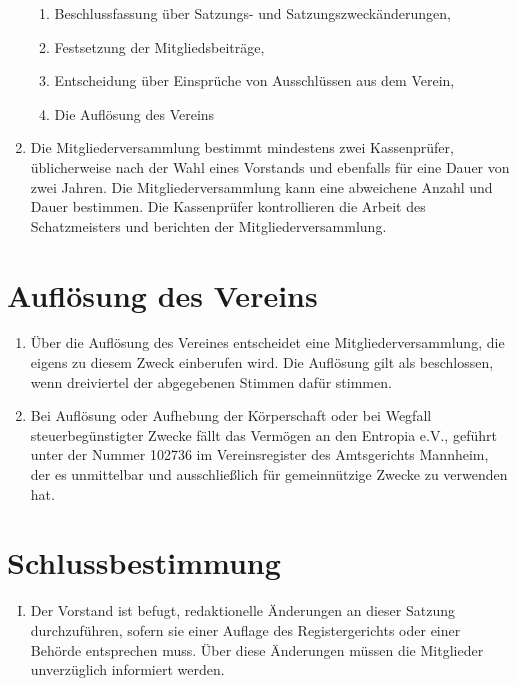 \documentclass[12pt,a4paper,titlepage]{scrartcl}
\begin{document}
\begin{enumerate}
\begin{enumerate}
\item Beschlussfassung über Satzungs- und Satzungszweckänderungen,
\item Festsetzung der Mitgliedsbeiträge,
\item Entscheidung über Einsprüche von Ausschlüssen aus dem Verein,
\item Die Auflösung des Vereins
\end{enumerate}
\item  Die Mitgliederversammlung bestimmt mindestens zwei Kassenprüfer, üblicherweise
nach der Wahl eines Vorstands und ebenfalls für eine Dauer von zwei Jahren. Die Mitgliederversammlung kann eine abweichene Anzahl und Dauer bestimmen. Die Kassenprüfer kontrollieren die Arbeit des Schatzmeisters und berichten der Mitgliederversammlung.
\end{enumerate}

\section{Auflösung des Vereins}
\begin{enumerate}
\item Über die Auflösung des Vereines entscheidet eine Mitgliederversammlung, die eigens zu diesem Zweck einberufen wird. Die Auflösung gilt als beschlossen, wenn dreiviertel der abgegebenen Stimmen dafür stimmen.
\item  Bei Auflösung oder Aufhebung der Körperschaft oder bei Wegfall steuerbegünstigter Zwecke fällt das Vermögen an den Entropia e.V., geführt unter der Nummer 102736 im Vereinsregister des Amtsgerichts Mannheim, der es unmittelbar und ausschließlich für gemeinnützige Zwecke zu verwenden hat.
\end{enumerate}


\section{Schlussbestimmung}
\begin{enumerate}[I.]
\item Der Vorstand ist befugt, redaktionelle Änderungen an dieser Satzung durchzuführen,
sofern sie einer Auflage des Registergerichts oder einer Behörde entsprechen muss. Über diese Änderungen müssen die Mitglieder unverzüglich informiert werden.
\end{enumerate}
\end{document}
